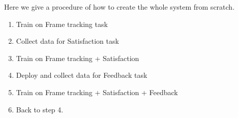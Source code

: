 Here we give a procedure of how to create the whole system from scratch.
\begin{enumerate}
    \item Train on Frame tracking task
    \item Collect data for Satisfaction task
    \item Train on Frame tracking + Satisfaction
    \item Deploy and collect data for Feedback task
    \item Train on Frame tracking + Satisfaction + Feedback
    \item Back to step 4.
\end{enumerate}
